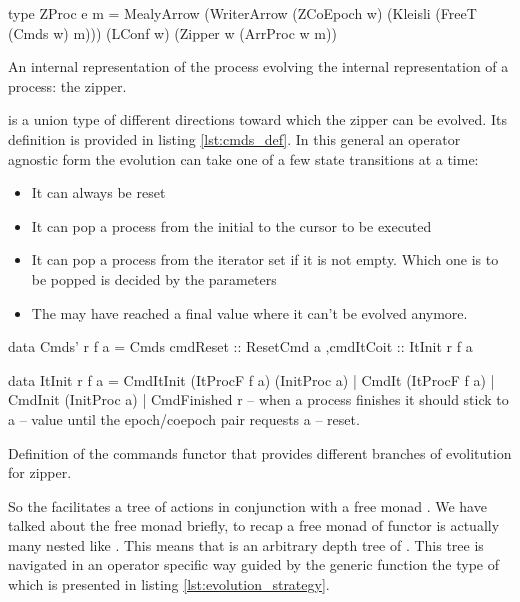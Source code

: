 \begin{code}
\begin{haskellcode}
type ZProc e m =
  MealyArrow
    (WriterArrow (ZCoEpoch w) (Kleisli (FreeT (Cmds w) m)))
    (LConf w)
    (Zipper w (ArrProc w m))
\end{haskellcode}
  \caption{\label{lst:zproc_def}An internal representation of the
    process evolving the internal representation of a process: the
    zipper.}
\end{code}


 is a union type of different directions toward which the
zipper can be evolved. Its definition is provided in listing
\ref{lst:cmds_def}. In this general an operator agnostic form the
evolution can take one of a few state transitions at a time:

\begin{itemize}
\item It can always be reset
\item It can pop a process from the initial to the cursor to be executed
\item It can pop a process from the iterator set if it is not
  empty. Which one is to be popped is decided by the parameters
\item The may have reached a final value where it can't be evolved
  anymore.
\end{itemize}

\begin{code}
\begin{haskellcode}
data Cmds' r f a =
  Cmds { cmdReset :: ResetCmd a
        ,cmdItCoit :: ItInit r f a
       }

data ItInit r f a
  = CmdItInit (ItProcF f a) (InitProc a)
  | CmdIt (ItProcF f a)
  | CmdInit (InitProc a)
  | CmdFinished r -- when a process finishes it should stick to a
                  -- value until the epoch/coepoch pair requests a
                  -- reset.
\end{haskellcode}
  \caption{\label{lst:cmds_def}Definition of the commands functor that
    provides different branches of evolitution for zipper.}
\end{code}

So the  facilitates a tree of actions in conjunction with a
free monad .  We have talked about the free monad briefly, to recap a
free monad of functor  is actually many  nested like
. This means that  is
an arbitrary depth tree of . This tree is navigated in an
operator specific way guided by the generic function
 the type of which is presented in listing
\ref{lst:evolution_strategy}.

